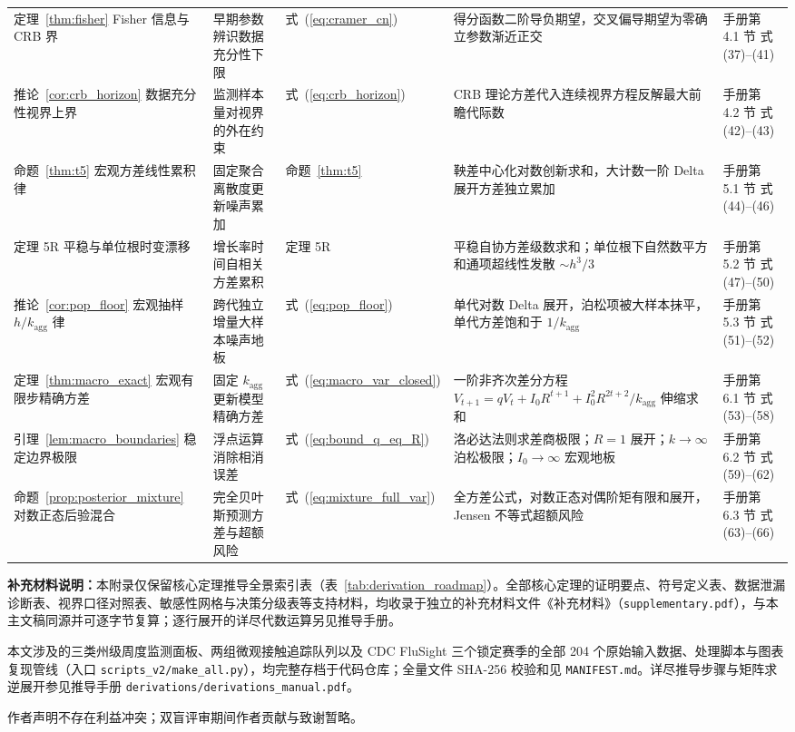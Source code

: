 \documentclass[10pt,a4paper]{article}
\theoremstyle{plain}
\theoremstyle{definition}
\begin{document}
\begin{table}[htbp]
{\begin{tabular}{@{}>{\raggedright\arraybackslash}p{2.6cm}>{\raggedright\arraybackslash}p{3.2cm}>{\raggedright\arraybackslash}p{2.0cm}>{\raggedright\arraybackslash}p{4.8cm}>{\raggedright\arraybackslash}p{2.8cm}@{}}
定理~\ref{thm:fisher} Fisher 信息与 CRB 界 & 早期参数辨识数据充分性下限 & 式~(\ref{eq:cramer_cn}) & 得分函数二阶导负期望，交叉偏导期望为零确立参数渐近正交 & 手册第 4.1 节 式 (37)--(41) \\
推论~\ref{cor:crb_horizon} 数据充分性视界上界 & 监测样本量对视界的外在约束 & 式~(\ref{eq:crb_horizon}) & CRB 理论方差代入连续视界方程反解最大前瞻代际数 & 手册第 4.2 节 式 (42)--(43) \\
命题~\ref{thm:t5} 宏观方差线性累积律 & 固定聚合离散度更新噪声累加 & 命题~\ref{thm:t5} & 鞅差中心化对数创新求和，大计数一阶 Delta 展开方差独立累加 & 手册第 5.1 节 式 (44)--(46) \\
定理 5R 平稳与单位根时变漂移 & 增长率时间自相关方差累积 & 定理 5R & 平稳自协方差级数求和；单位根下自然数平方和通项超线性发散 $\sim h^3/3$ & 手册第 5.2 节 式 (47)--(50) \\
推论~\ref{cor:pop_floor} 宏观抽样 $h/k_{\text{agg}}$ 律 & 跨代独立增量大样本噪声地板 & 式~(\ref{eq:pop_floor}) & 单代对数 Delta 展开，泊松项被大样本抹平，单代方差饱和于 $1/k_{\text{agg}}$ & 手册第 5.3 节 式 (51)--(52) \\
定理~\ref{thm:macro_exact} 宏观有限步精确方差 & 固定 $k_{\text{agg}}$ 更新模型精确方差 & 式~(\ref{eq:macro_var_closed}) & 一阶非齐次差分方程 $V_{t+1}=qV_t+I_0R^{t+1}+I_0^2R^{2t+2}/k_{\text{agg}}$ 伸缩求和 & 手册第 6.1 节 式 (53)--(58) \\
引理~\ref{lem:macro_boundaries} 稳定边界极限 & 浮点运算消除相消误差 & 式~(\ref{eq:bound_q_eq_R}) & 洛必达法则求差商极限；$R=1$ 展开；$k\to\infty$ 泊松极限；$I_0\to\infty$ 宏观地板 & 手册第 6.2 节 式 (59)--(62) \\
命题~\ref{prop:posterior_mixture} 对数正态后验混合 & 完全贝叶斯预测方差与超额风险 & 式~(\ref{eq:mixture_full_var}) & 全方差公式，对数正态对偶阶矩有限和展开，Jensen 不等式超额风险 & 手册第 6.3 节 式 (63)--(66) \\
\bottomrule
\end{tabular}%
}
\end{table}

\noindent\textbf{补充材料说明：}本附录仅保留核心定理推导全景索引表（表~\ref{tab:derivation_roadmap}）。全部核心定理的证明要点、符号定义表、数据泄漏诊断表、视界口径对照表、敏感性网格与决策分级表等支持材料，均收录于独立的补充材料文件《补充材料》（\texttt{supplementary.pdf}），与本主文稿同源并可逐字节复算；逐行展开的详尽代数运算另见推导手册。

 本文涉及的三类州级周度监测面板、两组微观接触追踪队列以及 CDC FluSight 三个锁定赛季的全部 204 个原始输入数据、处理脚本与图表复现管线（入口 \texttt{scripts\_v2/make\_all.py}），均完整存档于代码仓库；全量文件 SHA-256 校验和见 \texttt{MANIFEST.md}。详尽推导步骤与矩阵求逆展开参见推导手册 \texttt{derivations/derivations\_manual.pdf}。

\vspace{0.4em}
 作者声明不存在利益冲突；双盲评审期间作者贡献与致谢暂略。

\vspace{1.0em}
{\footnotesize
\setlength{\bibsep}{2.0pt plus 0.5pt minus 0.5pt}

\renewcommand{\refname}{参考文献：}


}
\end{document}
